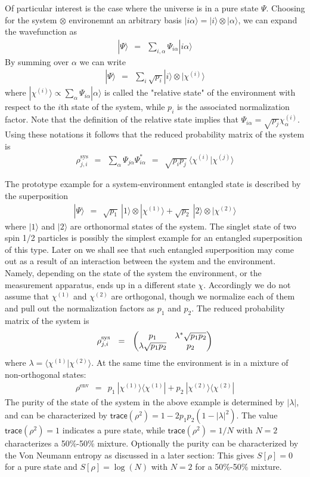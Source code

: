 \documentclass[onecolumn,fleqn]{revtex4}
\newcommand{\trc}{\mathsf{trace}}
\newcommand{\tbox}[1]{\text{#1}}
\newcommand{\amatrix}[1]{\begin{matrix} #1 \end{matrix}}
\newcommand{\beq}{\begin{eqnarray}}
\newcommand{\eeq}{\end{eqnarray}}
\begin{document}
Of particular interest is the case where the universe  
is in a pure state $\Psi$. Choosing for the system $\otimes$ environemnt  
an arbitrary basis ${|i\alpha\rangle = |i\rangle \otimes |\alpha\rangle }$,  
we can expand the wavefunction as 
\beq
|\Psi\rangle  \ \ = \ \ \sum_{i,\alpha} \Psi_{i\alpha} |i\alpha\rangle
\eeq
By summing over $\alpha$ we can write
\beq
|\Psi\rangle \ \ = \ \ \sum_{i} \sqrt{p_i} |i\rangle \otimes | \chi^{(i)} \rangle
\eeq
where $| \chi^{(i)} \rangle \propto \sum_{\alpha} \Psi_{i\alpha} |\alpha\rangle$ 
is called the "relative state" of the environment with respect 
to the $i$th state of the system, while $p_i$ is the associated normalization factor.
Note that the definition of the relative state implies 
that ${\Psi_{i\alpha} = \sqrt{p_j} \chi^{(i)}_{\alpha}}$. 
Using these notations it follows that the reduced probability matrix of the system is 
\beq
\rho^{\tbox{sys}}_{j,i} 
\ \ = \ \  
\sum_{\alpha} \Psi_{j\alpha}\Psi_{i\alpha}^* 
\ \ = \ \ 
\sqrt{p_ip_j} \ \langle \chi^{(i)} | \chi^{(j)} \rangle
\eeq



The prototype example for a system-environment entangled state 
is described by the superposition  
\beq
|\Psi\rangle \ \ = \ \ 
\sqrt{p_1}\ |1\rangle \otimes |\chi^{(1)}\rangle 
+  \sqrt{p_2}\ |2\rangle \otimes |\chi^{(2)}\rangle
\eeq
where $|1\rangle$ and $|2\rangle$ are orthonormal states of the system. 
The singlet state of two spin 1/2 particles is possibly the simplest 
example for an entangled superposition of this type. 
Later on we shall see that such entangled superposition may come out as 
a result of an interaction between the system and the environment. 
Namely, depending on the state of the system the environment, 
or the measurement apparatus, ends up in a different state $\chi$.
Accordingly we do not assume that $\chi^{(1)}$ and $\chi^{(2)}$ are orthogonal, 
though we normalize each of them and pull out the normalization 
factors as $p_1$ and $p_2$. The reduced probability matrix of the system is 
\beq
\rho^{\tbox{sys}}_{j,i} 
\ \ = \ \ 
\left(\amatrix{ 
p_1 & \lambda^* \sqrt{p_1p_2} \cr
\lambda \sqrt{p_1p_2} & p_2
}\right)
\eeq
where ${\lambda=\langle \chi^{(1)} | \chi^{(2)} \rangle}$. 
At the same time the environment is in a mixture 
of non-orthogonal states:  
\beq
\rho^{\tbox{env}}
\ \ = \ \ 
p_1 \ |\chi^{(1)}\rangle\langle \chi^{(1)}| 
+ p_2 \ |\chi^{(2)}\rangle\langle \chi^{(2)}|  
\eeq
The purity of the state of the system in the above 
example is determined by $|\lambda|$, and can be 
characterized by ${\trc(\rho^2)=1-2p_1p_2(1{-}|\lambda|^2)}$. 
The value ${\trc(\rho^2)=1}$ indicates a pure state, 
while ${\trc(\rho^2)=1/N}$ with ${N=2}$ 
characterizes a 50\%-50\% mixture.
Optionally the purity can be characterized by 
the Von Neumann entropy as discussed in a later section:  
This gives $S[\rho]=0$ for a pure state and ${S[\rho]=\log(N)}$ 
with ${N=2}$ for a 50\%-50\% mixture.
\end{document}
